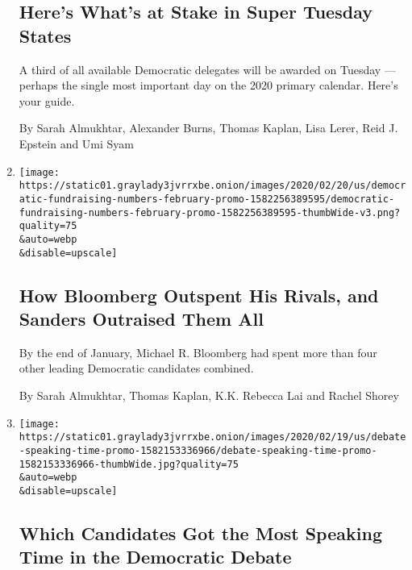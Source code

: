 \begin{enumerate}
  \hypertarget{heres-whats-at-stake-in-super-tuesday-states}{%
  \subsection{Here's What's at Stake in Super Tuesday
  States}\label{heres-whats-at-stake-in-super-tuesday-states}}

  A third of all available Democratic delegates will be awarded on
  Tuesday --- perhaps the single most important day on the 2020 primary
  calendar. Here's your guide.

  By Sarah Almukhtar, Alexander Burns, Thomas Kaplan, Lisa Lerer, Reid
  J. Epstein and Umi Syam
\item
  \href{/interactive/2020/02/21/us/politics/democratic-fundraising-numbers-february.html}{}

  \texttt{[image: https://static01.graylady3jvrrxbe.onion/images/2020/02/20/us/democratic-fundraising-numbers-february-promo-1582256389595/democratic-fundraising-numbers-february-promo-1582256389595-thumbWide-v3.png?quality=75\\\&auto=webp\\\&disable=upscale]}

  \hypertarget{how-bloomberg-outspent-his-rivals-and-sanders-outraised-them-all}{%
  \subsection{How Bloomberg Outspent His Rivals, and Sanders Outraised
  Them
  All}\label{how-bloomberg-outspent-his-rivals-and-sanders-outraised-them-all}}

  By the end of January, Michael R. Bloomberg had spent more than four
  other leading Democratic candidates combined.

  By Sarah Almukhtar, Thomas Kaplan, K.K. Rebecca Lai and Rachel Shorey
\item
  \href{/interactive/2020/02/19/us/elections/debate-speaking-time.html}{}

  \texttt{[image: https://static01.graylady3jvrrxbe.onion/images/2020/02/19/us/debate-speaking-time-promo-1582153336966/debate-speaking-time-promo-1582153336966-thumbWide.jpg?quality=75\\\&auto=webp\\\&disable=upscale]}

  \hypertarget{which-candidates-got-the-most-speaking-time-in-the-democratic-debate}{%
  \subsection{Which Candidates Got the Most Speaking Time in the
  Democratic
  Debate}\label{which-candidates-got-the-most-speaking-time-in-the-democratic-debate}}


\end{enumerate}
